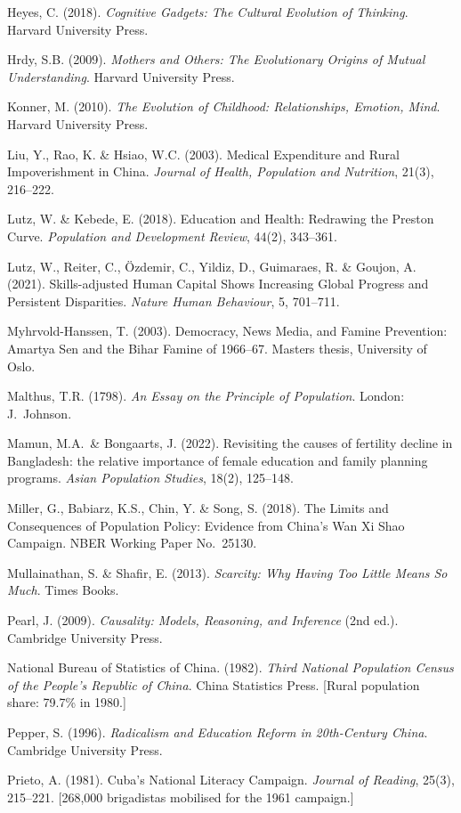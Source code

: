 \documentclass[12pt,letterpaper]{article}
\begin{document}
Heyes, C. (2018). \emph{Cognitive Gadgets: The Cultural Evolution of
Thinking}. Harvard University Press.

Hrdy, S.B. (2009). \emph{Mothers and Others: The Evolutionary Origins
of Mutual Understanding}. Harvard University Press.

Konner, M. (2010). \emph{The Evolution of Childhood: Relationships,
Emotion, Mind}. Harvard University Press.

Liu, Y., Rao, K. \& Hsiao, W.C. (2003). Medical Expenditure and Rural
Impoverishment in China. \emph{Journal of Health, Population and
Nutrition}, 21(3), 216--222.

Lutz, W. \& Kebede, E. (2018). Education and Health: Redrawing the
Preston Curve. \emph{Population and Development Review}, 44(2),
343--361.

Lutz, W., Reiter, C., Özdemir, C., Yildiz, D., Guimaraes, R. \& Goujon,
A. (2021). Skills-adjusted Human Capital Shows Increasing Global
Progress and Persistent Disparities. \emph{Nature Human Behaviour}, 5,
701--711.

Myhrvold-Hanssen, T. (2003). Democracy, News Media, and Famine
Prevention: Amartya Sen and the Bihar Famine of 1966--67. Masters thesis,
University of Oslo.

Malthus, T.R. (1798). \emph{An Essay on the Principle of Population}.
London: J.~Johnson.

Mamun, M.A.~\& Bongaarts, J. (2022). Revisiting the causes of fertility
decline in Bangladesh: the relative importance of female education and
family planning programs. \emph{Asian Population Studies}, 18(2),
125--148.

Miller, G., Babiarz, K.S., Chin, Y. \& Song, S. (2018). The Limits and
Consequences of Population Policy: Evidence from China's Wan Xi Shao
Campaign. NBER Working Paper No.~25130.

Mullainathan, S. \& Shafir, E. (2013). \emph{Scarcity: Why Having Too
Little Means So Much}. Times Books.

Pearl, J. (2009). \emph{Causality: Models, Reasoning, and Inference}
(2nd ed.). Cambridge University Press.

National Bureau of Statistics of China. (1982). \emph{Third National
Population Census of the People's Republic of China}. China Statistics
Press. {[}Rural population share: 79.7\% in 1980.{]}

Pepper, S. (1996). \emph{Radicalism and Education Reform in 20th-Century
China}. Cambridge University Press.

Prieto, A. (1981). Cuba's National Literacy Campaign. \emph{Journal of
Reading}, 25(3), 215--221. {[}268,000 brigadistas mobilised for the 1961
campaign.{]}
\end{document}
